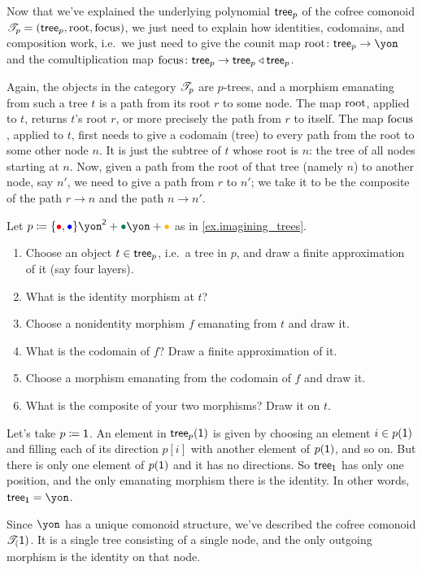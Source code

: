 \documentclass[Book-Poly]{subfiles}
\begin{document}
Now that we've explained the underlying polynomial $\mathsf{tree}_p$ of the cofree comonoid $\mathscr{T}_{p}=(\mathsf{tree}_p,\mathrm{root},\mathrm{focus})$, we just need to explain how identities, codomains, and composition work, i.e.\ we just need to give the counit map $\rt\colon\tr_p\to\yon$ and the comultiplication map $\mathrm{focus}\colon\mathsf{tree}_p\to\mathsf{tree}_p\mathbin{\triangleleft}\mathsf{tree}_p$. 

Again, the objects in the category $\mathscr{T}_{p}$ are $p$-trees, and a morphism emanating from such a tree $t$ is a path from its root $r$ to some node. The map $\mathrm{root}$, applied to $t$, returns $t$'s root $r$, or more precisely the path from $r$ to itself. The map $\mathrm{focus}$, applied to $t$, first needs to give a codomain (tree) to every path from the root to some other node $n$. It is just the subtree of $t$ whose root is $n$: the tree of all nodes starting at $n$. Now, given a path from the root of that tree (namely $n$) to another node, say $n'$, we need to give a path from $r$ to $n'$; we take it to be the composite of the path $r\to n$ and the path $n\to n'$.

\begin{exercise}
Let $p\coloneqq\{\bul[red],\bul[blue]\}\yon^\2+\bul[dgreen]\yon+\bul[dyellow]$ as in \cref{ex.imagining_trees}.
\begin{enumerate}
	\item Choose an object $t\in \mathsf{tree}_p$, i.e.\ a tree in $p$, and draw a finite approximation of it (say four layers).
	\item What is the identity morphism at $t$?
	\item Choose a nonidentity morphism $f$ emanating from $t$ and draw it.
	\item What is the codomain of $f$? Draw a finite approximation of it.
	\item Choose a morphism emanating from the codomain of $f$ and draw it.
	\item What is the composite of your two morphisms? Draw it on $t$.
\qedhere
\end{enumerate}
\end{exercise}

\begin{example}
Let's take $p\coloneqq\textsf{1}$. An element in $\mathsf{tree}_p(\textsf{1})$ is given by choosing an element $i\in p(\textsf{1})$ and filling each of its direction $p[i]$ with another element of $p(\textsf{1})$, and so on. But there is only one element of $p(\textsf{1})$ and it has no directions. So $\mathsf{tree}_{\textsf{1}}$ has only one position, and the only emanating morphism there is the identity. In other words, $\tr_\1=\yon$.

Since $\yon$ has a unique comonoid structure, we've described the cofree comonoid $\mathscr{T}_{(}\textsf{1})$. It is a single tree consisting of a single node, and the only outgoing morphism is the identity on that node.
\end{example}
\end{document}
